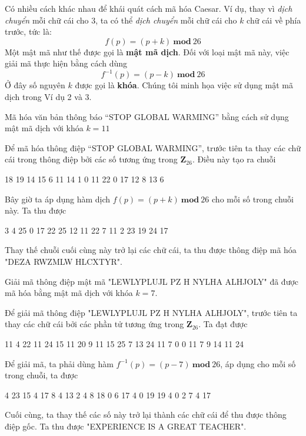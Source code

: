 Có nhiều cách khác nhau để khái quát cách mã hóa Caesar. Ví dụ, thay vì \textit{dịch chuyển} mỗi chữ cái cho 3,
ta có thể \textit{dịch chuyển} mỗi chữ cái cho $k$ chữ cái về phía trước, tức là:
$$f(p) = (p+k)\ \mathbf{mod}\ 26$$
Một mật mã như thế được gọi là \textbf{mật mã dịch}. Đối với loại mật mã này, việc giải mã thực hiện bằng cách dùng
$$f^{-1}(p) = (p-k)\ \mathbf{mod}\ 26$$
Ở đây số nguyên $k$ được gọi là \textbf{khóa}. Chúng tôi minh họa việc sử dụng mật mã dịch trong Ví dụ 2 và 3.
\begin{example}
    Mã hóa văn bản thông báo “STOP GLOBAL WARMING” bằng cách sử dụng mật mã dịch với khóa $k = 11$
\end{example}
\begin{solution}
    Để mã hóa thông điệp “STOP GLOBAL WARMING”, trước tiên ta thay các chữ cái trong thông điệp bởi các số tương ứng trong $ \mathbf{Z}_{26} $. Điều này tạo ra chuỗi
    \begin{center}
        18 19 14 15 \hspace{0.5cm} 6 11 14 1 0 11 \hspace{0.5cm} 22 0 17 12 8 13 6
    \end{center}
    Bây giờ ta áp dụng hàm dịch $f(p) = (p+k)\ \mathbf{mod}\ 26$ cho mỗi số trong chuỗi này. Ta thu được
    \begin{center}
        3 4 25 0 \hspace{0.5cm} 17 22 25 12 11 22 \hspace{0.5cm} 7 11 2 23 19 24 17
    \end{center}
    Thay thế chuỗi cuối cùng này trở lại các chữ cái, ta thu được thông điệp mã hóa
    "DEZA RWZMLW HLCXTYR".
\end{solution}
\begin{example}
    Giải mã thông điệp mật mã "LEWLYPLUJL PZ H NYLHA ALHJOLY" đã được mã
    hóa bằng mật mã dịch với khóa $k = 7$.
\end{example}
\begin{solution}
    Để giải mã thông điệp "LEWLYPLUJL PZ H NYLHA ALHJOLY", trước tiên ta
    thay các chữ cái bởi các phần tử tương ứng trong $ \mathbf{Z}_{26} $. Ta đạt được
    \begin{center}
        11 4 22 11 24 15 11 20 9 11 \hspace{0.5cm} 15 25 \hspace{0.5cm} 7 \hspace{0.5cm} 13 24 11 7 0 \hspace{0.5cm} 0 11 7 9 14 11 24
    \end{center}
    Để giải mã, ta phải dùng hàm $f^{-1}(p) = (p-7)\ \mathbf{mod}\ 26$, áp dụng cho mỗi số trong chuỗi, ta được
    \begin{center}
        4 23 15 4 17 8 4 13 2 4 \hspace{0.5cm} 8 18 \hspace{0.5cm} 0 \hspace{0.5cm} 6 17 4 0 19 \hspace{0.5cm}  19 4 0 2 7 4 17
    \end{center}
    Cuối cùng, ta thay thế các số này trở lại thành các chữ cái để thu được thông điệp gốc. Ta thu được "EXPERIENCE IS A GREAT TEACHER".
\end{solution}

